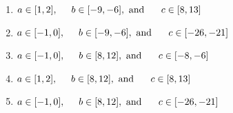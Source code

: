 \documentclass[14pt]{extbook}
\begin{document}
\begin{enumerate}
{\begin{center}
\end{center}
\begin{enumerate}[label=\Alph*.]
\item \( a \in [1, 2], \hspace*{5mm} b \in [-9, -6], \text{ and } \hspace*{5mm} c \in [8, 13] \)
\item \( a \in [-1, 0], \hspace*{5mm} b \in [-9, -6], \text{ and } \hspace*{5mm} c \in [-26, -21] \)
\item \( a \in [-1, 0], \hspace*{5mm} b \in [8, 12], \text{ and } \hspace*{5mm} c \in [-8, -6] \)
\item \( a \in [1, 2], \hspace*{5mm} b \in [8, 12], \text{ and } \hspace*{5mm} c \in [8, 13] \)
\item \( a \in [-1, 0], \hspace*{5mm} b \in [8, 12], \text{ and } \hspace*{5mm} c \in [-26, -21] \)

\end{enumerate} }
\end{enumerate}
\end{document}
